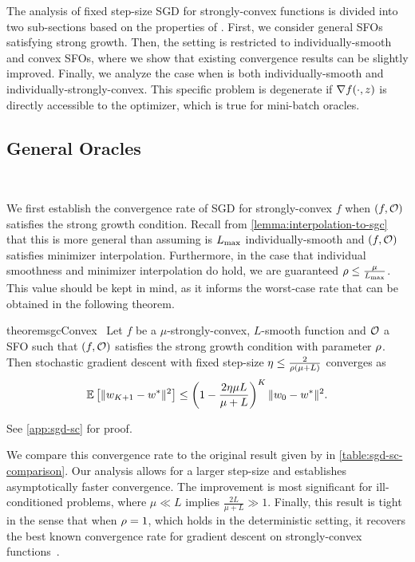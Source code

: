 The analysis of fixed step-size \ac{SGD} for strongly-convex functions is divided into two sub-sections based on the properties of \oracle{}.
First, we consider general \acp{SFO} satisfying strong growth. 
Then, the setting is restricted to individually-smooth and convex \acp{SFO}, where we show that existing convergence results can be slightly improved.
Finally, we analyze the case when \oracle{} is both individually-smooth and individually-strongly-convex.
This specific problem is degenerate if \( \grad(\cdot, z) \) is directly accessible to the optimizer, which is true for mini-batch oracles. 

\subsection{General Oracles}~\label{sec:sgd-sc-general}

We first establish the convergence rate of \ac{SGD} for strongly-convex \( f \) when \( \rbr{f, \oracle} \) satisfies the strong growth condition. 
Recall from \autoref{lemma:interpolation-to-sgc} that this is more general than assuming \oracle{} is \( \Lmax \) individually-smooth and \( \rbr{f, \oracle} \) satisfies minimizer interpolation. 
Furthermore, in the case that individual smoothness and minimizer interpolation do hold, we are guaranteed \( \sgc \leq \frac{\mu}{\Lmax} \).
This value should be kept in mind, as it informs the worst-case rate that can be obtained in the following theorem. 

\begin{restatable}{theorem}{sgcConvex}~\label{thm:sgc-convex}
    Let \( f \) be a \( \mu \)-strongly-convex, \( L \)-smooth function and \( \oracle{} \) a \ac{SFO} such that \( \rbr{f, \oracle{}} \) satisfies the strong growth condition with parameter \( \sgc \).
    Then stochastic gradient descent with fixed step-size \( \eta \leq \frac{2}{\sgc(\mu + L)} \) converges as 
    \[ \E\sbr{\norm{\w_{K+1} - \wopt}^2} \leq \rbr{1 - \frac{2\eta \mu L}{\mu + L}}^K \norm{\w_0 - \wopt}^2. \] 
\end{restatable}%
\noindent See \autoref{app:sgd-sc} for proof.\hfill \break

We compare this convergence rate to the original result given by \citet[Section 6]{schmidt2013fast} in \autoref{table:sgd-sc-comparison}.
Our analysis allows for a larger step-size and establishes asymptotically faster convergence.
The improvement is most significant for ill-conditioned problems, where \( \mu \ll L \) implies \( \frac{2 L}{\mu + L} \gg 1 \). 
Finally, this result is tight in the sense that when \( \sgc = 1 \), which holds in the deterministic setting, it recovers the best known convergence rate for gradient descent on strongly-convex functions~\citep[Theorem 3.12]{bubeck2015convex}.

